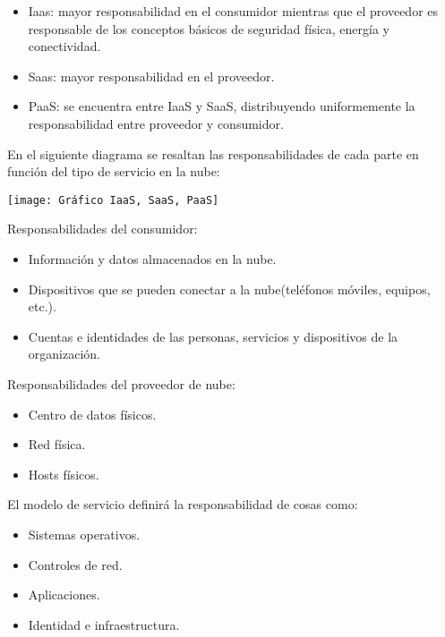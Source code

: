 \documentclass[runningheads]{llncs}
\providecommand{\tightlist}{%
  \setlength{\itemsep}{0pt}\setlength{\parskip}{0pt}}
\begin{document}
\begin{itemize}
\tightlist
\item
  Iaas: mayor responsabilidad en el consumidor mientras que el proveedor
  es responsable de los conceptos básicos de seguridad física, energía y
  conectividad.
\item
  Saas: mayor responsabilidad en el proveedor.
\item
  PaaS: se encuentra entre IaaS y SaaS, distribuyendo uniformemente la
  responsabilidad entre proveedor y consumidor.
\end{itemize}

En el siguiente diagrama se resaltan las responsabilidades de cada parte
en función del tipo de servicio en la nube:

\texttt{[image: Gráfico IaaS, SaaS, PaaS]}

Responsabilidades del consumidor:

\begin{itemize}
\tightlist
\item
  Información y datos almacenados en la nube.
\item
  Dispositivos que se pueden conectar a la nube(teléfonos móviles,
  equipos, etc.).
\item
  Cuentas e identidades de las personas, servicios y dispositivos de la
  organización.
\end{itemize}

Responsabilidades del proveedor de nube:

\begin{itemize}
\tightlist
\item
  Centro de datos físicos.
\item
  Red física.
\item
  Hosts físicos.
\end{itemize}

El modelo de servicio definirá la responsabilidad de cosas como:

\begin{itemize}
\tightlist
\item
  Sistemas operativos.
\item
  Controles de red.
\item
  Aplicaciones.
\item
  Identidad e infraestructura.
\end{itemize}

%
\end{document}
